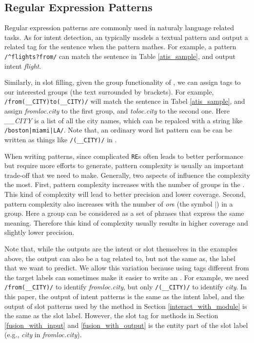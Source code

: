 \subsection{Regular Expression Patterns}
\label{re_desc}
Regular expression patterns are commonly used in naturaly language related tasks. As for intent detection, an \RE typically models a textual pattern and output a related tag for the sentence when the pattern mathes. For example, a pattern 
\texttt{/\textasciicircum flights?\:from/} can match the sentence in Table \ref{atis_sample}, and output intent \emph{flight}. 


Similarly, in slot filling, given the group functionality of \RE, we can assign tags to our interested groups (the text surrounded by brackets). For example, \texttt{/from\:(\_\_CITY)\:to\:(\_\_CITY)/} will match the sentence in Tabel \ref{atis_sample}, and assign \emph{fromloc.city} to the first group, and \emph{toloc.city} to the second one. Here \emph{\_\_CITY} is a list of all the city names, which can be repalced with a string like \texttt{/boston|miami|LA/}. 
Note that, an ordinary word list pattern can be can be written as things like \texttt{/(\_\_CITY)/} in \RE.

When writing \RE patterns, since complicated \texttt{RE}s often leads to better performance but require more efforts to generate, pattern complexity is usually an important trade-off that we need to make. Generally, two aspects of \RE influence the complexity the most. First, pattern complexity increases with the number of groups in the \RE. This kind of complexity will lead to better precision and lower coverage. Second, pattern complexity also increases with the number of \emph{or}s (the symbol $|$) in a group. Here a group can be considered as a set of phrases that express the same meaning. Therefore this kind of complexity usually results in higher coverage and slightly lower precision. 

Note that, while the outputs are the intent or slot themselves in the examples above, the \RE output can also be a tag related to, but not the same as, the label that we want to predict.
We allow this variation because using tags different from the target labels can sometimes make it easier to write an \RE. For example, we need \texttt{/from\:(\_\_CITY)/} to identify \emph{fromloc.city}, but only \texttt{/(\_\_CITY)/} to identify \emph{city}. In this paper, the output of intent patterns is the same as the intent label, and the output of slot patterns used by the method in Section \ref{interact_with_module} is the same as the slot label. However, the slot \RE tag for methods in Section \ref{fusion_with_input} and \ref{fusion_with_output} is the entity part of the slot label (e.g., \emph{city} in \emph{fromloc.city}).



